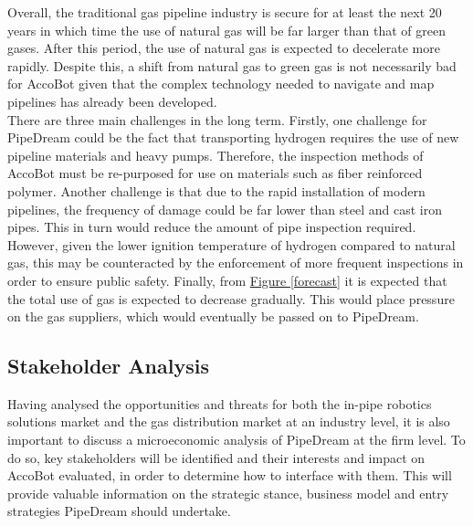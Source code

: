 \documentclass[11pt]{article}		%
\newcommand{\figref}[1]{\hyperref[#1]{Figure \ref*{#1}}}    %
\begin{document}
    		Overall, the traditional gas pipeline industry is secure for at least the next 20 years in which time the use of natural gas will be far larger than that of green gases. After this period, the use of natural gas is expected to decelerate more rapidly. Despite this, a shift from natural gas to green gas is not necessarily bad for AccoBot given that the complex technology needed to navigate and map pipelines has already been developed. 
    		\\
    	    \hspace*{2ex}There are three main challenges in the long term. Firstly, one challenge for PipeDream could be the fact that transporting hydrogen requires the use of new pipeline materials and heavy pumps. Therefore, the inspection methods of AccoBot must be re-purposed for use on materials such as fiber reinforced polymer. Another challenge is that due to the rapid installation of modern pipelines, the frequency of damage could be far lower than steel and cast iron pipes. This in turn would reduce the amount of pipe inspection required. However, given the lower ignition temperature of hydrogen compared to natural gas, this may be counteracted by the enforcement of more frequent inspections in order to ensure public safety. Finally, from \figref{forecast} it is expected that the total use of gas is expected to decrease gradually. This would place pressure on the gas suppliers, which would eventually be passed on to PipeDream. 

	\subsection{Stakeholder Analysis}

		Having analysed the opportunities and threats for both the in-pipe robotics solutions market and the gas distribution market at an industry level, it is also important to discuss a microeconomic analysis of PipeDream at the firm level. To do so, key stakeholders will be identified and  their interests and impact on AccoBot evaluated, in order to determine how to interface with them. This will provide valuable information on the strategic stance, business model and entry strategies PipeDream should undertake.
		
\end{document}
